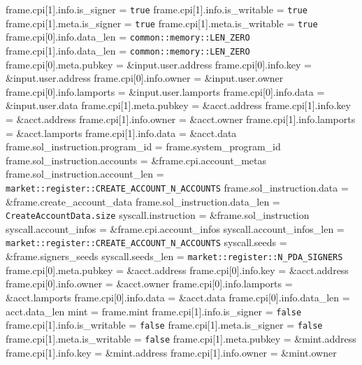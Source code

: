 \begin{algorithm}
\begin{algorithmic}
  \STATE frame.cpi[1].info.is\_signer = \texttt{true}
  \STATE frame.cpi[1].info.is\_writable = \texttt{true}
  \STATE frame.cpi[1].meta.is\_signer = \texttt{true}
  \STATE frame.cpi[1].meta.is\_writable = \texttt{true}
  \STATE frame.cpi[0].info.data\_len = \texttt{common::memory::LEN\_ZERO}
  \STATE frame.cpi[1].info.data\_len = \texttt{common::memory::LEN\_ZERO}
  \STATE frame.cpi[0].meta.pubkey = \&input.user.address
  \STATE frame.cpi[0].info.key = \&input.user.address
  \STATE frame.cpi[0].info.owner = \&input.user.owner
  \STATE frame.cpi[0].info.lamports = \&input.user.lamports
  \STATE frame.cpi[0].info.data = \&input.user.data
  \STATE frame.cpi[1].meta.pubkey = \&acct.address
  \STATE frame.cpi[1].info.key = \&acct.address
  \STATE frame.cpi[1].info.owner = \&acct.owner
  \STATE frame.cpi[1].info.lamports = \&acct.lamports
  \STATE frame.cpi[1].info.data = \&acct.data
  \STATE frame.sol\_instruction.program\_id = frame.system\_program\_id
  \STATE frame.sol\_instruction.accounts = \&frame.cpi.account\_metas
  \STATE frame.sol\_instruction.account\_len =
    \texttt{market::register::CREATE\_ACCOUNT\_N\_ACCOUNTS}
  \STATE frame.sol\_instruction.data = \&frame.create\_account\_data
  \STATE frame.sol\_instruction.data\_len = \texttt{CreateAccountData.size}
  \STATE syscall.instruction = \&frame.sol\_instruction
  \STATE syscall.account\_infos = \&frame.cpi.account\_infos
  \STATE syscall.account\_infos\_len =
    \texttt{market::register::CREATE\_ACCOUNT\_N\_ACCOUNTS}
  \STATE syscall.seeds = \&frame.signers\_seeds
  \STATE syscall.seeds\_len = \texttt{market::register::N\_PDA\_SIGNERS}
  \STATE {}
  \STATE frame.cpi[0].meta.pubkey = \&acct.address
  \STATE frame.cpi[0].info.key = \&acct.address
  \STATE frame.cpi[0].info.owner = \&acct.owner
  \STATE frame.cpi[0].info.lamports = \&acct.lamports
  \STATE frame.cpi[0].info.data = \&acct.data
  \STATE frame.cpi[0].info.data\_len = acct.data\_len
  \STATE mint = frame.mint
  \STATE frame.cpi[1].info.is\_signer = \texttt{false}
  \STATE frame.cpi[1].info.is\_writable = \texttt{false}
  \STATE frame.cpi[1].meta.is\_signer = \texttt{false}
  \STATE frame.cpi[1].meta.is\_writable = \texttt{false}
  \STATE frame.cpi[1].meta.pubkey = \&mint.address
  \STATE frame.cpi[1].info.key = \&mint.address
  \STATE frame.cpi[1].info.owner = \&mint.owner

\end{algorithmic}
\end{algorithm}
